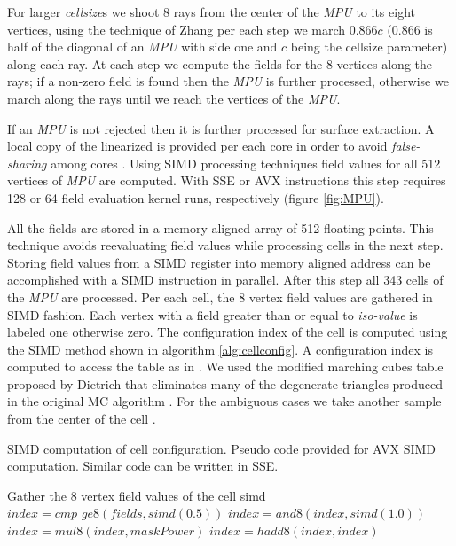 For larger \textit{cellsize}s we shoot 8 rays from the center of the \textit{MPU} to its eight vertices, using  the technique of Zhang \etal per 
each step we march $0.866c$ (0.866 is half of the diagonal of an \textit{MPU} with side one and $c$ being the cellsize parameter) along each ray. 
At each step we compute the fields for the 8 vertices along the rays; if a non-zero field is found then the \textit{MPU} is further processed, 
otherwise we march along the rays until we reach the vertices of the \textit{MPU}. 

If an \textit{MPU} is not rejected then it is further processed for surface extraction. A local copy of the linearized \blob is provided 
per each core in order to avoid \textit{false-sharing} among cores \cite{Bolosky1993}. Using SIMD processing techniques field values for all
512 vertices of \textit{MPU} are computed. With SSE or AVX instructions this step requires 128 or 64 field evaluation kernel runs, 
respectively (figure \ref{fig:MPU}).

All the fields are stored in a memory aligned array of 512 floating points. This technique avoids reevaluating field values while processing
cells in the next step. Storing field values from a SIMD register into memory aligned address can be accomplished with a SIMD instruction in
parallel. After this step all 343 cells of the \textit{MPU} are processed. Per each cell, the 8 vertex field values 
are gathered in SIMD fashion. Each vertex with a field greater than or equal to \textit{iso-value} is labeled one otherwise zero. 
The configuration index of the cell is computed using the SIMD method shown in algorithm \ref{alg:cellconfig}. A configuration index 
is computed to access the table as in \cite{Lorensen1987}. We used the modified marching cubes table proposed by Dietrich \etal that eliminates many 
of the degenerate triangles produced in the original MC algorithm \cite{Dietrich2009}. For the ambiguous cases we take another sample 
from the center of the cell \cite{Wyvill1986, Dietrich2009}. 

\begin{algorithm}[H]
\caption{SIMD computation of cell configuration. Pseudo code provided for AVX SIMD computation. Similar code can be written in SSE.}
\label{alg:cellconfig}
\begin{algorithmic}[1]	
  \STATE Gather the 8 vertex field values of the cell  
  \STATE simd $index = cmp\_ge8(fields, simd(0.5))$
  \STATE $index = and8(index, simd(1.0))$
  \STATE $index = mul8(index, maskPower)$  
  \STATE $index = hadd8(index, index)$   
\end{algorithmic}
\end{algorithm}

